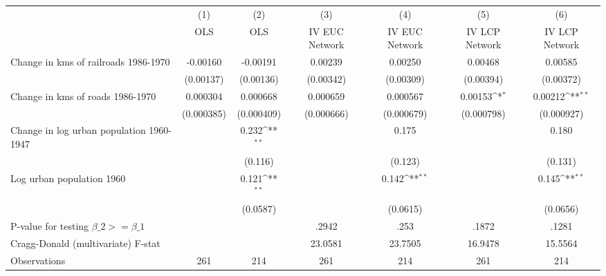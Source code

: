 {
\def\sym#1{\ifmmode^{#1}\else\(^{#1}\)\fi}
\begin{tabular}{l*{6}{c}}
\hline\hline
                &\multicolumn{1}{c}{(1)}&\multicolumn{1}{c}{(2)}&\multicolumn{1}{c}{(3)}&\multicolumn{1}{c}{(4)}&\multicolumn{1}{c}{(5)}&\multicolumn{1}{c}{(6)}\\
                &\multicolumn{1}{c}{OLS}&\multicolumn{1}{c}{OLS}&\multicolumn{1}{c}{IV EUC Network}&\multicolumn{1}{c}{IV EUC Network}&\multicolumn{1}{c}{IV LCP Network}&\multicolumn{1}{c}{IV LCP Network}\\
\hline
Change in kms of railroads 1986-1970& -0.00160         & -0.00191         &  0.00239         &  0.00250         &  0.00468         &  0.00585         \\
                &(0.00137)         &(0.00136)         &(0.00342)         &(0.00309)         &(0.00394)         &(0.00372)         \\
[1em]
Change in kms of roads 1986-1970& 0.000304         & 0.000668         & 0.000659         & 0.000567         &  0.00153\sym{*}  &  0.00212\sym{**} \\
                &(0.000385)         &(0.000409)         &(0.000666)         &(0.000679)         &(0.000798)         &(0.000927)         \\
[1em]
Change in log urban population 1960-1947&                  &    0.232\sym{**} &                  &    0.175         &                  &    0.180         \\
                &                  &  (0.116)         &                  &  (0.123)         &                  &  (0.131)         \\
[1em]
Log urban population 1960&                  &    0.121\sym{**} &                  &    0.142\sym{**} &                  &    0.145\sym{**} \\
                &                  & (0.0587)         &                  & (0.0615)         &                  & (0.0656)         \\
\hline
P-value for testing $\beta\_{2} >= \beta\_{1}$&                  &                  &    .2942         &     .253         &    .1872         &    .1281         \\
Cragg-Donald (multivariate) F-stat&                  &                  &  23.0581         &  23.7505         &  16.9478         &  15.5564         \\
Observations    &      261         &      214         &      261         &      214         &      261         &      214         \\
\hline\hline
\end{tabular}
}
